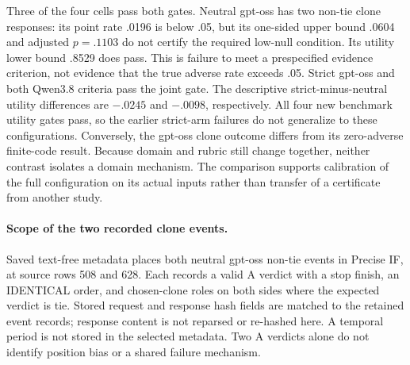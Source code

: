 \documentclass[10pt]{article}
\begin{document}


Three of the four cells pass both gates. Neutral gpt-oss has two non-tie clone responses: its point rate .0196 is below .05, but its one-sided upper bound .0604 and adjusted $p=.1103$ do not certify the required low-null condition. Its utility lower bound .8529 does pass. This is failure to meet a prespecified evidence criterion, not evidence that the true adverse rate exceeds .05. Strict gpt-oss and both Qwen3.8 criteria pass the joint gate. The descriptive strict-minus-neutral utility differences are $-.0245$ and $-.0098$, respectively. All four new benchmark utility gates pass, so the earlier strict-arm failures do not generalize to these configurations. Conversely, the gpt-oss clone outcome differs from its zero-adverse finite-code result. Because domain and rubric still change together, neither contrast isolates a domain mechanism. The comparison supports calibration of the full configuration on its actual inputs rather than transfer of a certificate from another study.

\paragraph{Scope of the two recorded clone events.}
Saved text-free metadata places both neutral gpt-oss non-tie events in Precise IF, at source rows 508 and 628. Each records a valid A verdict with a stop finish, an IDENTICAL order, and chosen-clone roles on both sides where the expected verdict is tie. Stored request and response hash fields are matched to the retained event records; response content is not reparsed or re-hashed here. A temporal period is not stored in the selected metadata. Two A verdicts alone do not identify position bias or a shared failure mechanism.
\end{document}
